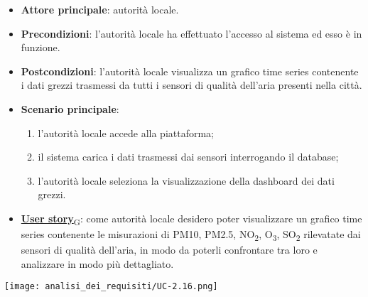 \begin{itemize}
	\item \textbf{Attore principale}: autorità locale.
	\item \textbf{Precondizioni}: l'autorità locale ha effettuato l'accesso al sistema ed esso è in funzione.
	\item \textbf{Postcondizioni}: l'autorità locale visualizza un grafico time series contenente i dati grezzi trasmessi da tutti i sensori
	      di qualità dell'aria presenti nella città.
	\item \textbf{Scenario principale}:
	      \begin{enumerate}
		      \item l'autorità locale accede alla piattaforma;
		      \item il sistema carica i dati trasmessi dai sensori interrogando il database;
		      \item l'autorità locale seleziona la visualizzazione della dashboard dei dati grezzi.
	      \end{enumerate}
	\item \href{https://7last.github.io/docs/pb/documentazione-interna/glossario\#user-story}{\textbf{User story}\textsubscript{G}}:
	      come autorità locale desidero poter visualizzare un grafico time series contenente le misurazioni di PM10, PM2.5, NO\textsubscript{2}, O\textsubscript{3}, SO\textsubscript{2}
	      rilevatate dai sensori di qualità dell'aria, in modo da poterli confrontare tra loro e analizzare in modo più dettagliato.
\end{itemize}
\begin{center}
	\texttt{[image: analisi\_dei\_requisiti/UC-2.16.png]}
\end{center}


